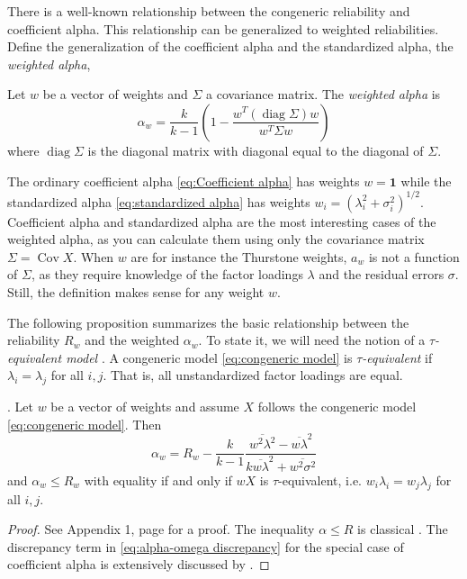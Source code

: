 \documentclass[twoside]{article}
\DeclareMathOperator{\Cov}{Cov}
\DeclareMathOperator{\diag}{diag}
\renewcommand{\sqrt}[1]{{(#1)^{1/2}}}
\begin{document}
There is a well-known relationship between the congeneric reliability and coefficient alpha. This relationship can be generalized to weighted reliabilities. Define the generalization of the coefficient alpha and the standardized alpha, the \textit{weighted alpha},

\begin{defn}
Let $w$ be a vector of weights and $\Sigma$ a covariance matrix. The \textit{weighted alpha} is
\begin{equation}
\alpha_{w}=\frac{k}{k-1}\left(1-\frac{w^{T}(\diag\Sigma)w}{w^{T}\Sigma w}\right)\label{eq:weighted alpha}
\end{equation}
where $\diag\Sigma$ is the diagonal matrix with diagonal equal to the diagonal of $\Sigma$.
\end{defn}
The ordinary coefficient alpha \eqref{eq:Coefficient alpha} has weights $w=\boldsymbol{1}$
while the standardized alpha \eqref{eq:standardized alpha} has weights $w_{i}=\sqrt{\lambda_{i}^{2}+\sigma_{i}^{2}}$. Coefficient alpha and standardized alpha are the most interesting cases of the weighted alpha, as you can calculate them using only the covariance matrix $\Sigma = \Cov X$. When $w$ are for instance the Thurstone weights, $a_w$ is not a function of $\Sigma$, as they require knowledge of the factor loadings $\lambda$ and the residual errors $\sigma$. Still, the definition makes sense for any weight $w$. 

The following proposition summarizes the basic relationship
between the reliability $ R_{w}$ and the weighted $\alpha_{w}$. To state it, we will need
the notion of a \textit{$\tau$-equivalent model} \citep[][section 2.13]{Lord1968-ax}. A congeneric model \eqref{eq:congeneric model} is \textit{$\tau$-equivalent} if $\lambda_{i}=\lambda_{j}$ for all $i,j$. That is, all unstandardized
factor loadings are equal.
\begin{prop}
\label{prop:weighted alpha}. Let $w$ be a vector of weights and
assume $X$ follows the congeneric model \eqref{eq:congeneric model}. Then 
\begin{equation}
\alpha_{w}= R_{w}-\frac{k}{k-1}\frac{\overline{w^{2}\lambda^{2}}-\overline{w\lambda}^{2}}{k\overline{w\lambda}^{2}+\overline{w^{2}\sigma^{2}}}\label{eq:alpha-omega discrepancy}
\end{equation}
and $\alpha_w \leq  R_w$ with equality if and only if $wX$ is $\tau$-equivalent, i.e. $w_i\lambda_{i}=w_j\lambda_{j}$
for all $i,j$.
\end{prop}
\begin{proof}
See Appendix 1, page \pageref{proof:weighted alpha}
for a proof. The inequality $\alpha\leq R$ is classical \citep[][Theorem 4.4.3]{Lord1968-ax}. The discrepancy term in \eqref{eq:alpha-omega discrepancy} for the special case of coefficient alpha is extensively discussed by \citet{Raykov1997-bu}. 
\end{proof}
\end{document}
